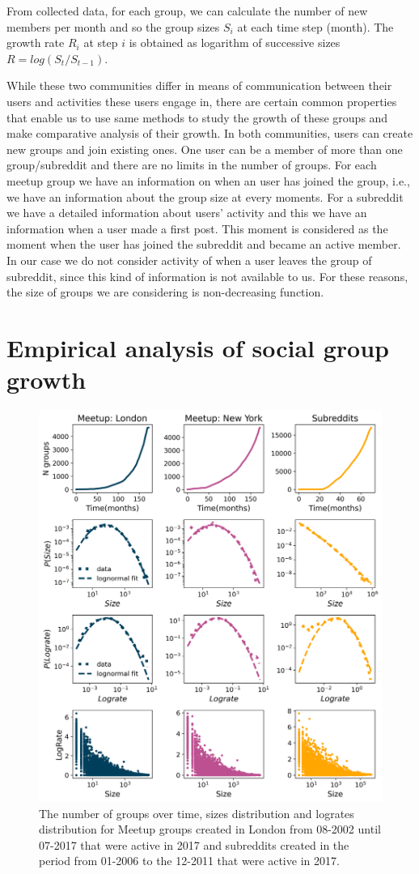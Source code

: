 From collected data, for each group, we can calculate the number of new members per month and so the group sizes $S_i$ at each time step (month). The growth rate $R_i$ at step $i$ is obtained as logarithm of successive sizes $R = log(S_t/S_{t-1})$. 


While these two communities differ in means of communication between their users and activities these users engage in, there are certain common properties that enable us to use same methods to study the growth of these groups and make comparative analysis of their growth. In both communities, users can create new groups and join existing ones. One user can be a member of more than one group/subreddit and there are no limits in the number of groups. For each meetup group we have an information on when an user has joined the group, i.e., we have an information about the group size at every moments. For a subreddit we have a detailed information about users' activity and this we have an information when a user made a first post. This moment is considered as the moment when the user has joined the subreddit and became an active member. In our case we do not consider activity of when a user leaves the group of subreddit, since this kind of information is not available to us. For these reasons, the size of groups we are considering is non-decreasing function. 

\section{Empirical analysis of social group growth \label{sec:emp}}
\begin{figure}[h!]
	\centering
	\includegraphics[width=0.6\linewidth]{Figures/Fig2.png}
	\caption{The number of groups over time, sizes distribution and logrates distribution for Meetup groups created in London from 08-2002 until 07-2017 that were active in 2017 and subreddits created in the period from 01-2006 to the  12-2011 that were active in 2017. }
	\label{fig:data1}
\end{figure}

